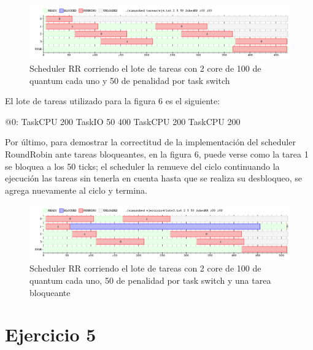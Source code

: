 \documentclass[a4paper,10pt,twoside]{article}
\newenvironment{pseudo}[1][]{%
    \vspace{0.5em}%
    \begin{algorithmic}%
}
{%
    \end{algorithmic}%
    \vspace{0.5em}%
}
\begin{document}
\begin{figure}[ht!]
\centering
\includegraphics[width=175mm]{../ejercicio4/SchedRR2Core.png}
\caption{Scheduler RR corriendo el lote de tareas con 2 core de 100 de quantum cada uno y 50 de penalidad por task switch}
\label{overflow}
\end{figure}

El lote de tareas utilizado para la figura 6 es el siguiente:
\begin{pseudo}
	\State @0:
	\State TaskCPU 200
	\State TaskIO 50 400
	\State TaskCPU 200
	\State TaskCPU 200
\end{pseudo}

Por último, para demostrar la correctitud de la implementación del scheduler RoundRobin ante tareas bloqueantes, en la figura 6, puede verse como la tarea 1 se bloquea a los 50 ticks; el scheduler la remueve del ciclo continuando la ejecución las tareas sin tenerla en cuenta hasta que se realiza su desbloqueo, se agrega nuevamente al ciclo y termina.

\begin{figure}[ht!]
\centering
\includegraphics[width=175mm]{../ejercicio4/SchedRR2CoreIO.png}
\caption{Scheduler RR corriendo el lote de tareas con 2 core de 100 de quantum cada uno, 50 de penalidad por task switch y una tarea bloqueante}
\label{overflow}
\end{figure}



\section{Ejercicio 5}
\end{document}
